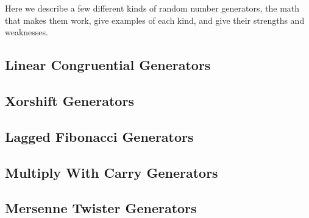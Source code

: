 Here we describe a few different kinds of random number generators, the math that makes them work, give examples of each kind, and give their strengths and weaknesses.

\subsection{Linear Congruential Generators}
\label{sec:lcg}


\subsection{Xorshift Generators}
\label{sec:xorshift}


\subsection{Lagged Fibonacci Generators}
\label{sec:laggedfib}


\subsection{Multiply With Carry Generators}
\label{sec:mwc}


\subsection{Mersenne Twister Generators}
\label{sec:mt}

